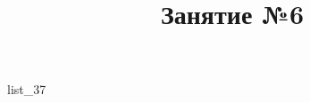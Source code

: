 \documentclass[12pt, a4paper]{article}
\begin{document}
	\title{Занятие №6}
	{list_37}
\end{document}
